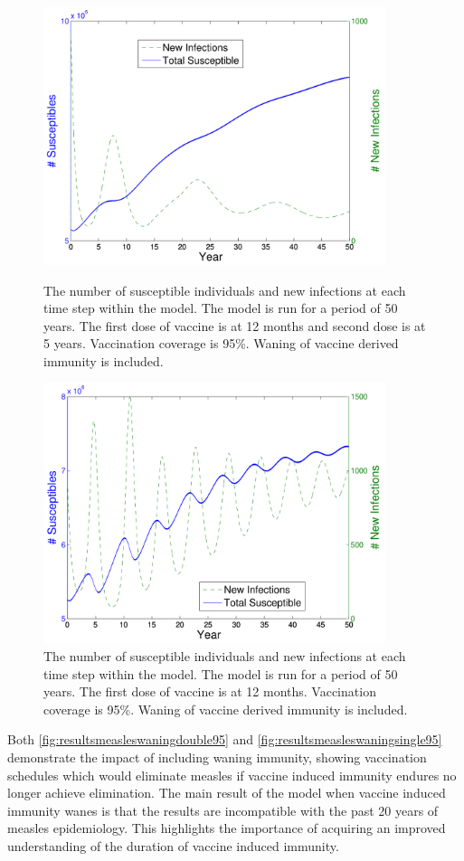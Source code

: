 \documentclass[a4paper,11pt] {scrartcl}
\begin{document}
\begin{figure}[hp]
	\centering
	\includegraphics[width=100mm]{measleswaningdouble95}
	\caption{The number of susceptible individuals and new infections at each time step within the model. The model is run for a period of 50 years. The first dose of vaccine is at 12 months and second dose is at 5 years. Vaccination coverage is 95\%. Waning of vaccine derived immunity is included.}
	\label{fig:resultsmeasleswaningdouble95}

	\includegraphics[width=100mm]{measleswaningsingle95}
	\caption{The number of susceptible individuals and new infections at each time step within the model. The model is run for a period of 50 years. The first dose of vaccine is at 12 months. Vaccination coverage is 95\%. Waning of vaccine derived immunity is included.}
	\label{fig:resultsmeasleswaningsingle95}
\end{figure}

Both \autoref{fig:resultsmeasleswaningdouble95} and \autoref{fig:resultsmeasleswaningsingle95} demonstrate the impact of including waning immunity, showing vaccination schedules which would eliminate measles if vaccine induced immunity endures no longer achieve elimination. The main result of the model when vaccine induced immunity wanes is that the results are incompatible with the past 20 years of measles epidemiology. This highlights the importance of acquiring an improved understanding of the duration of vaccine induced immunity.
\end{document}
